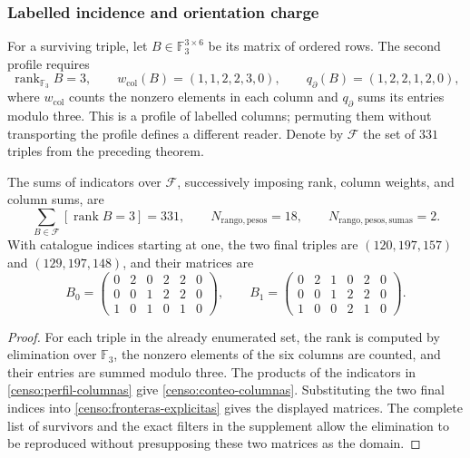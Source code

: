 \subsubsection{Labelled incidence and orientation charge}

For a surviving triple, let \(B\in\mathbb F_3^{3\times6}\) be its
matrix of ordered rows. The second profile requires
\begin{equation}
 \operatorname{rank}_{\mathbb F_3}B=3,\qquad
 w_{\mathrm{col}}(B)=(1,1,2,2,3,0),\qquad
 q_{\partial}(B)=(1,2,2,1,2,0),
 \label{censo:perfil-columnas}
\end{equation}
where \(w_{\mathrm{col}}\) counts the nonzero elements in each
column and \(q_{\partial}\) sums its entries modulo three. This is a profile
of labelled columns; permuting them without transporting the profile defines a different
reader. Denote by \(\mathcal F\) the set of \(331\) triples
from the preceding theorem.

\begin{proposition}
\label{censo:dos-matrices}
The sums of indicators over \(\mathcal F\), successively imposing
rank, column weights, and column sums, are
\begin{equation}
 \sum_{B\in\mathcal F}[\operatorname{rank}B=3]=331,
 \qquad N_{\mathrm{rango,pesos}}=18,
 \qquad N_{\mathrm{rango,pesos,sumas}}=2.
 \label{censo:conteo-columnas}
\end{equation}
With catalogue indices starting at one, the two final triples are
\((120,197,157)\) and \((129,197,148)\), and their matrices are
\[
 B_0=\begin{pmatrix}0&2&0&2&2&0\\0&0&1&2&2&0\\1&0&1&0&1&0\end{pmatrix},
 \qquad
 B_1=\begin{pmatrix}0&2&1&0&2&0\\0&0&1&2&2&0\\1&0&0&2&1&0\end{pmatrix}.
\]
\end{proposition}
\begin{proof}
For each triple in the already enumerated set, the rank is computed by elimination
over \(\mathbb F_3\), the nonzero elements of the six
columns are counted, and their entries are summed modulo three. The products of the indicators
in \eqref{censo:perfil-columnas} give \eqref{censo:conteo-columnas}.
Substituting the two final indices into
\eqref{censo:fronteras-explicitas} gives the displayed matrices. The complete
list of survivors and the exact filters in the supplement allow
the elimination to be reproduced without presupposing these two matrices as the domain.
\end{proof}

